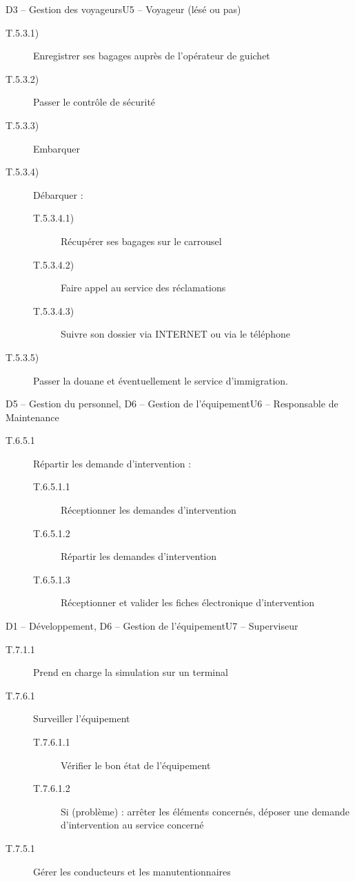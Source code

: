 \dta
{D3 -- Gestion des voyageurs}{U5 -- Voyageur (lésé ou pas)}
{}
{
\begin{description}
	\item [T.5.3.1)] Enregistrer ses bagages auprès de l'opérateur de guichet \typeactivite{[manuel]}
	\item [T.5.3.2)] Passer le contrôle de sécurité \typeactivite{[manuel]}
	\item [T.5.3.3)] Embarquer \typeactivite{[manuel]}
	\item [T.5.3.4)] Débarquer : 
	\begin{description}
		\item [T.5.3.4.1)] Récupérer ses bagages sur le carrousel \typeactivite{[manuel]}
		\item [T.5.3.4.2)] Faire appel au service des réclamations \typeactivite{[manuel]}
		\item [T.5.3.4.3)] Suivre son dossier via INTERNET ou via le téléphone \typeactivite{[manuel]}
	\end{description}
	\item [T.5.3.5)] Passer la douane et éventuellement le service d'immigration. \typeactivite{[manuel]}
\end{description}
}

\dta
{D5 -- Gestion du personnel, D6 -- Gestion de l'équipement}{U6 -- Responsable de Maintenance}{}
{
\begin{description}
	\item[T.6.5.1] Répartir les demande d'intervention : 
	\begin{description}
		\item[T.6.5.1.1] Réceptionner les demandes d'intervention \typeactivite{[système]}
		\item[T.6.5.1.2] Répartir les demandes d'intervention \typeactivite{[système]}
		\item[T.6.5.1.3] Réceptionner et valider les fiches électronique d'intervention \typeactivite{[système]}
	\end{description}
\end{description}
}

\dta
{D1 -- Développement, D6 -- Gestion de l'équipement}{U7 -- Superviseur}
{}
{
\begin{description}
	\item[T.7.1.1] Prend en charge la simulation sur un terminal \typeactivite{[système]}
	\item[T.7.6.1] Surveiller l'équipement 
	\begin{description}
		\item[T.7.6.1.1] Vérifier le bon état de l'équipement \typeactivite{[système]}
		\item[T.7.6.1.2] Si (problème) : arrêter les éléments concernés, déposer une demande d'intervention au service concerné \typeactivite{[système]}
	\end{description}
	\item[T.7.5.1] Gérer les conducteurs et les manutentionnaires \typeactivite{[manuel]}
\end{description}
}

